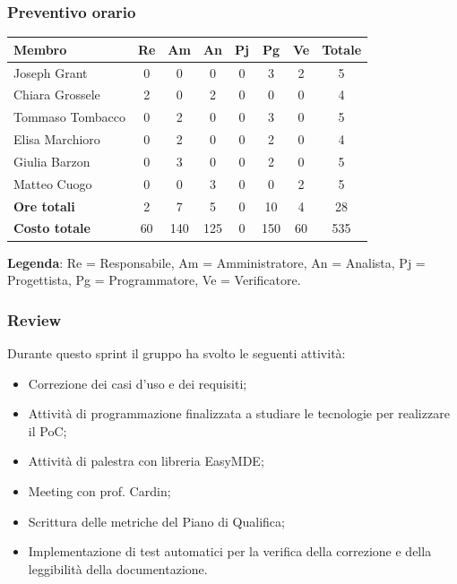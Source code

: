 \documentclass[11pt,a4paper]{article}
\begin{document}
\subsubsection{Preventivo orario}
\begin{center}
    \begin{tabular}{|l|c|c|c|c|c|c|c|}
        \hline
        \textbf{Membro} & \textbf{Re} & \textbf{Am} & \textbf{An} & \textbf{Pj} & \textbf{Pg} & \textbf{Ve} & \textbf{Totale} \\
        \hline
        Joseph Grant & 0 & 0 & 0 & 0 & 3 & 2 & 5 \\
        \hline
        Chiara Grossele & 2 & 0 & 2 & 0 & 0 & 0 & 4 \\
        \hline
        Tommaso Tombacco & 0 & 2 & 0 & 0 & 3 & 0 & 5 \\
        \hline
        Elisa Marchioro & 0 & 2 & 0 & 0 & 2 & 0 & 4 \\
        \hline
        Giulia Barzon & 0 & 3 & 0 & 0 & 2 & 0 & 5 \\
        \hline
        Matteo Cuogo & 0 & 0 & 3 & 0 & 0 & 2 & 5 \\
        \hline
        \textbf{Ore totali} & 2 & 7 & 5 & 0 & 10 & 4 & 28 \\
        \hline
        \textbf{Costo totale} & 60 & 140 & 125 & 0 & 150 & 60 & 535 \\
        \hline
    \end{tabular}
\end{center}

\noindent \textbf{Legenda}: Re = Responsabile, Am = Amministratore, An = Analista, Pj = Progettista, Pg = Programmatore, Ve = Verificatore.

\subsubsection{Review}
Durante questo sprint il gruppo ha svolto le seguenti attività:

\begin{itemize}
        \item Correzione dei casi d'uso e dei requisiti;
        \item Attività di programmazione finalizzata a studiare le tecnologie per realizzare il PoC;
        \item Attività di palestra con libreria EasyMDE;
        \item Meeting con prof. Cardin;
        \item Scrittura delle metriche del Piano di Qualifica;
        \item Implementazione di test automatici per la verifica della correzione e della leggibilità della documentazione.
    \end{itemize}
\end{document}
